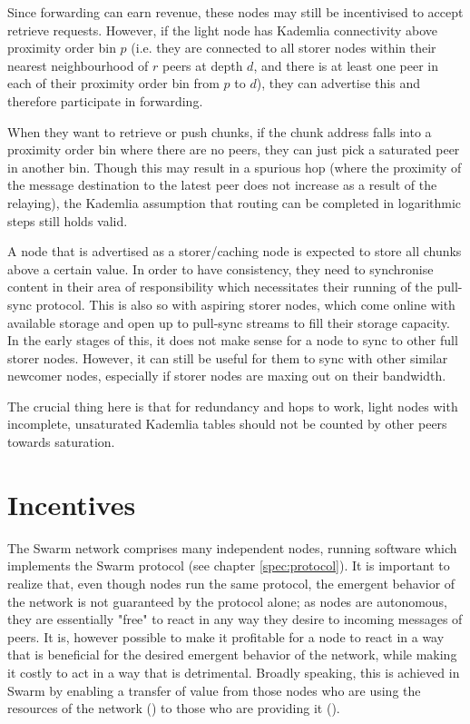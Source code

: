 Since forwarding can earn revenue, these nodes may still be incentivised to accept retrieve requests. However, if the light node has Kademlia connectivity above proximity order bin $p$ (i.e. they  are connected to all storer nodes within their nearest neighbourhood of $r$ peers at depth $d$, and there is at least one peer in each of their proximity order bin from $p$ to $d$), they can advertise this and therefore participate in forwarding. 

When they want to retrieve or push chunks, if the chunk address falls into a proximity order bin where there are no peers, they can just pick a saturated peer in another bin. Though this may result in a spurious hop (where the proximity of the message  destination to the latest peer does not increase as a result of the relaying), the Kademlia assumption that routing can be completed in logarithmic steps still holds valid.

A node that is advertised as a storer/caching node is expected to store all chunks  above a certain value. In order to have consistency, they need to synchronise content in their area of responsibility which necessitates their running of the pull-sync protocol. This is also so with aspiring storer nodes, which come online with available storage and open up to pull-sync streams to fill their storage capacity. In the early stages of this, it does not make sense for a node to sync to other full storer nodes. However, it can still be useful for them to sync with other similar newcomer nodes, especially if storer nodes are maxing out on their bandwidth.

The crucial thing here is that for redundancy and hops to work, light nodes with   incomplete, unsaturated Kademlia tables should not be counted by other peers towards saturation.


\chapter{Incentives}\label{sec:incentivisation}
The Swarm network comprises many independent nodes, running software which implements the Swarm protocol (see chapter \ref{spec:protocol}). It is important to realize that, even though nodes run the same protocol, the emergent behavior of the network is not guaranteed by the protocol alone; as nodes are autonomous, they are essentially "free" to react in any way they desire to incoming messages of peers.
It is, however possible to make it profitable for a node to react in a way that is beneficial for the desired emergent behavior of the network, while making it costly to act in a way that is detrimental. Broadly speaking, this is achieved in Swarm by enabling a transfer of value from those nodes who are using the resources of the network () to those who are providing it (). 


